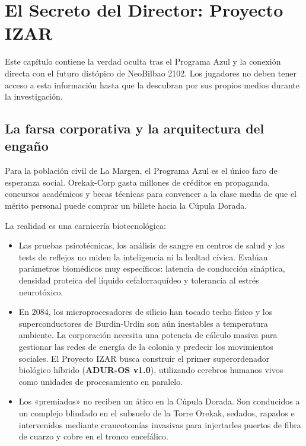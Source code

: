\chapter{El Secreto del Director: Proyecto IZAR}

\begin{CajaSecreto}
\par
Este capítulo contiene la verdad oculta tras el Programa Azul y la conexión directa con el futuro distópico de NeoBilbao 2102. Los jugadores no deben tener acceso a esta información hasta que la descubran por sus propios medios durante la investigación.
\end{CajaSecreto}

\section{La farsa corporativa y la arquitectura del engaño}


Para la población civil de La Margen, el Programa Azul es el único faro de esperanza social. Orekak-Corp gasta millones de créditos en propaganda, concursos académicos y becas técnicas para convencer a la clase media de que el mérito personal puede comprar un billete hacia la Cúpula Dorada.

La realidad es una carnicería biotecnológica:

\begin{itemize}
  \item {} Las pruebas psicotécnicas, los análisis de sangre en centros de salud y los tests de reflejos no miden la inteligencia ni la lealtad cívica. Evalúan parámetros biomédicos muy específicos: latencia de conducción sináptica, densidad proteica del líquido cefalorraquídeo y tolerancia al estrés neurotóxico.
  \item {} En 2084, los microprocesadores de silicio han tocado techo físico y los superconductores de Burdin-Urdin son aún inestables a temperatura ambiente. La corporación necesita una potencia de cálculo masiva para gestionar las redes de energía de la colonia y predecir los movimientos sociales. El Proyecto IZAR busca construir el primer superordenador biológico híbrido (\textbf{ADUR-OS v1.0}), utilizando cerebros humanos vivos como unidades de procesamiento en paralelo.
  \item {} Los «premiados» no reciben un ático en la Cúpula Dorada. Son conducidos a un complejo blindado en el subsuelo de la Torre Orekak, sedados, rapados e intervenidos mediante craneotomías invasivas para injertarles puertos de fibra de cuarzo y cobre en el tronco encefálico.
\end{itemize}

